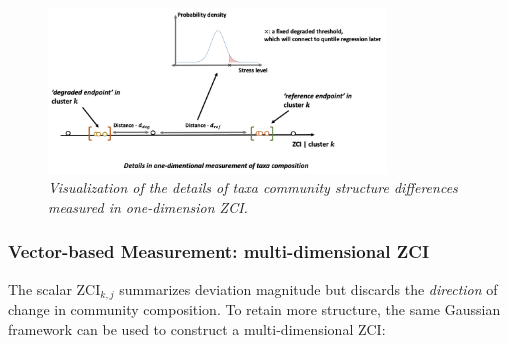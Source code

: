 \begin{figure}[!h]
\centering
\includegraphics[width=0.8\textwidth]{../presentation/figures/p15_details_of_taxa_difference_in_1dimention.png}
\caption{\textit{Visualization of the details of taxa community structure differences measured in one-dimension ZCI.}}
\label{fig:p15_details_of_taxa_difference_in_1dimention}
\end{figure}

\subsubsection{Vector-based Measurement: multi-dimensional ZCI}
The scalar $\mathrm{ZCI}_{k,j}$ summarizes deviation magnitude but discards the 
\emph{direction} of change in community composition.  
To retain more structure, the same Gaussian framework can be used to construct a 
multi-dimensional ZCI:

